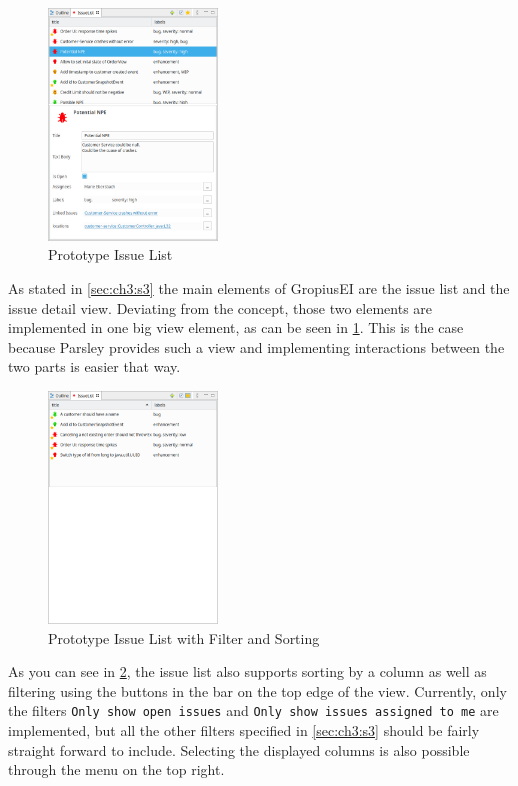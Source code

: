 \begin{figure}[!h]
	\centering
	\includegraphics[width=0.4\textwidth]{graphics/screenshot_gropius_ei_issue_list.png}
	\caption{Prototype Issue List}
	\label{fig:c4:screenshot_issue_list}
\end{figure}
As stated in \cref{sec:ch3:s3} the main elements of \gls{GropiusEI} are the issue list and the issue detail view.
Deviating from the concept, those two elements are implemented in one big view element, as can be seen in \cref{fig:c4:screenshot_issue_list}.
This is the case because \gls{Parsley} provides such a view and implementing interactions between the two  parts is easier that way.

\begin{figure}[!h]
	\centering
	\includegraphics[width=0.4\textwidth]{graphics/screenshot_gropius_ei_issue_list_filtered_sorted.png}
	\caption{Prototype Issue List with Filter and Sorting}
	\label{fig:c4:screenshot_issue_list_filtered_sorted}
\end{figure}
As you can see in \cref{fig:c4:screenshot_issue_list_filtered_sorted}, the issue list also supports sorting by a column as well as filtering using the buttons in the bar on the top edge of the view.
Currently, only the filters \lstinline|Only show open issues| and \lstinline|Only show issues assigned to me| are implemented, 
but all the other filters specified in \cref{sec:ch3:s3} should be fairly straight forward to include.
Selecting the displayed columns is also possible through the menu on the top right.

